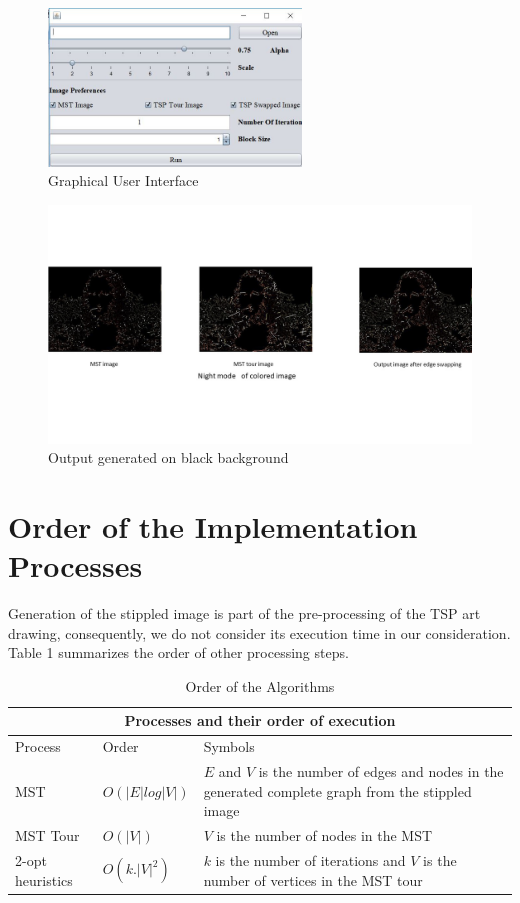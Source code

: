 \documentclass[a4paper,12pt]{article}
\begin{document}
\begin{figure}[htb]
\centering
\includegraphics[width=0.6\textwidth]{Capture_GUI.JPG}
\caption{Graphical User Interface}
\label{fig:pc2}
\end{figure}


\begin{figure}[htb]
\centering
\includegraphics[width=\textwidth]{Presentation2.jpg}
\caption{Output generated on black background}
\label{fig:pc}
\end{figure}

\medskip

\section{Order of the Implementation Processes}
Generation of the stippled image is part of the pre-processing of the TSP art drawing, consequently, we do not consider its execution time in our consideration. Table 1 summarizes the order of other processing steps.

\begin{table}[h!]
\label{table:summary}
\caption{Order of the Algorithms}
\begin{tabular}{ |p{3.5cm}||p{3.5cm}|p{3.5cm}|}
 \hline
 \multicolumn{3}{|c|}{Processes and their order of execution} \\
 \hline
 Process & Order & Symbols \\
 \hline
 MST	& $O(|E|log|V|)$ & $E$ and $V$ is the number of edges and nodes in the generated complete graph from the stippled image\\
 \hline
 MST Tour & $O(|V|)$ &  $V$ is the number of nodes in the MST\\
 \hline
 2-opt heuristics & $O(k.|V|^2)$ & $k$ is the number of iterations and $V$ is the number of vertices in the MST tour\\
 \hline
 \end{tabular}
 \end{table}
\medskip
\end{document}
